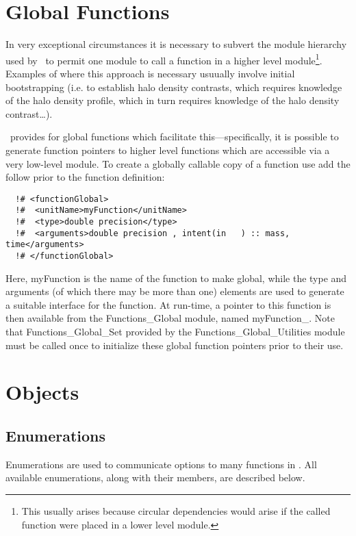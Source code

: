 \section{Global Functions}

In very exceptional circumstances it is necessary to subvert the module hierarchy used by \glc\ to permit one module to call a function in a higher level module\footnote{This usually arises because circular dependencies would arise if the called function were placed in a lower level module.}. Examples of where this approach is necessary usuually involve initial bootstrapping (i.e. to establish halo density contrasts, which requires knowledge of the halo density profile, which in turn requires knowledge of the halo density contrast\ldots).

\glc\ provides for global functions which facilitate this---specifically, it is possible to generate function pointers to higher level functions which are accessible via a very low-level module. To create a globally callable copy of a function use add the follow prior to the function definition:
\begin{verbatim}
  !# <functionGlobal>
  !#  <unitName>myFunction</unitName>
  !#  <type>double precision</type>
  !#  <arguments>double precision , intent(in   ) :: mass, time</arguments>
  !# </functionGlobal>
\end{verbatim}
Here, {\normalfont \ttfamily myFunction} is the name of the function to make global, while the {\normalfont \ttfamily type} and {\normalfont \ttfamily arguments} (of which there may be more than one) elements are used to generate a suitable interface for the function. At run-time, a pointer to this function is then available from the {\normalfont \ttfamily Functions\_Global} module, named {\normalfont \ttfamily myFunction\_}. Note that {\normalfont \ttfamily Functions\_Global\_Set} provided by the {\normalfont \ttfamily Functions\_Global\_Utilities} module must be called once to initialize these global function pointers prior to their use.

\section{Objects}

\subsection{Enumerations}

Enumerations are used to communicate options to many functions in \glc. All available enumerations, along with their members, are described below.

